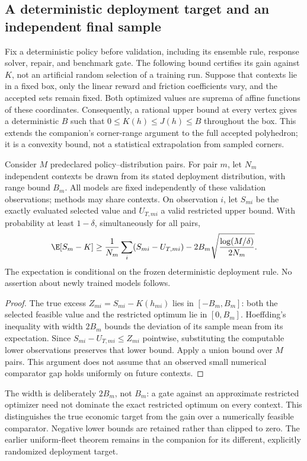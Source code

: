 \subsection{A deterministic deployment target and an independent final sample}
Fix a deterministic policy before validation, including its ensemble rule, response solver, repair, and benchmark gate. The following bound certifies its gain against $K$, not an artificial random selection of a training run. Suppose that contexts lie in a fixed box, only the linear reward and friction coefficients vary, and the accepted sets remain fixed. Both optimized values are suprema of affine functions of these coordinates. Consequently, a rational upper bound at every vertex gives a deterministic $B$ such that
$0\leq K(h)\leq J(h)\leq B$ throughout the box. This extends the companion's corner-range argument to the full accepted polyhedron; it is a convexity bound, not a statistical extrapolation from sampled corners.

\begin{proposition}\label{prop:r22-validation}
Consider $M$ predeclared policy--distribution pairs. For pair $m$, let $N_m$ independent contexts be drawn from its stated deployment distribution, with range bound $B_m$. All models are fixed independently of these validation observations; methods may share contexts. On observation $i$, let $S_{mi}$ be the exactly evaluated selected value and $U_{T,mi}$ a valid restricted upper bound. With probability at least $1-\delta$, simultaneously for all pairs,
\begin{equation}\label{eq:r22-validation}
 \E[S_m-K]\geq\frac1{N_m}\sum_i(S_{mi}-U_{T,mi})
 -2B_m\sqrt{\frac{\log(M/\delta)}{2N_m}}.
\end{equation}
The expectation is conditional on the frozen deterministic deployment rule. No assertion about newly trained models follows.
\end{proposition}
\begin{proof}
The true excess $Z_{mi}=S_{mi}-K(h_{mi})$ lies in $[-B_m,B_m]$: both the selected feasible value and the restricted optimum lie in $[0,B_m]$. Hoeffding's inequality with width $2B_m$ bounds the deviation of its sample mean from its expectation. Since $S_{mi}-U_{T,mi}\leq Z_{mi}$ pointwise, substituting the computable lower observations preserves that lower bound. Apply a union bound over $M$ pairs. This argument does not assume that an observed small numerical comparator gap holds uniformly on future contexts.
\end{proof}
The width is deliberately $2B_m$, not $B_m$: a gate against an approximate restricted optimizer need not dominate the exact restricted optimum on every context. This distinguishes the true economic target from the gain over a numerically feasible comparator. Negative lower bounds are retained rather than clipped to zero. The earlier uniform-fleet theorem remains in the companion for its different, explicitly randomized deployment target.
